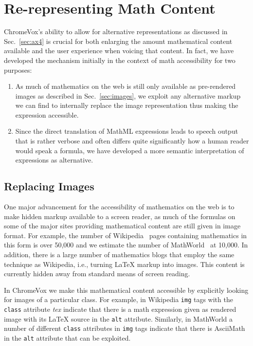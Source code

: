 \documentclass{sig-alternate}
\begin{document}
\section{Re-representing Math Content}
\label{sec:alternative}

ChromeVox's ability to allow for alternative representations as discussed in
Sec.~\ref{sec:ax4} is crucial for both enlarging the amount mathematical content
available and the user experience when voicing that content. In fact, we have
developed the mechanism initially in the context of math accessibility for two
purposes:
\begin{enumerate}
\item As much of mathematics on the web is still only available as
  pre-rendered images as described in Sec.~\ref{sec:images}, we exploit any
  alternative markup we can find to internally replace the image representation
  thus making the expression accessible. 
\item Since the direct translation of MathML expressions leads to speech output
  that is rather verbose and often differs quite significantly how a human
  reader would speak a formula, we have developed a more semantic interpretation
  of expressions as alternative.
\end{enumerate}

\subsection{Replacing Images}
\label{sec:rep-images}

One major advancement for the accessibility of mathematics on the web is to make
hidden markup available to a screen reader, as much of the formulas on some of
the major sites providing mathematical content are still given in image format.
For example, the number of Wikipedia~\cite{wikipedia} pages containing
mathematics in this form is over 50,000 and we estimate the number of
MathWorld~\cite{mathworld} at 10,000. In addition, there is a large number of
mathematics blogs that employ the same technique as Wikipedia, i.e., turning
{\LaTeX} markup into images. This content is currently hidden away from standard
means of screen reading.

In ChromeVox we make this mathematical content accessible by explicitly looking
for images of a particular class.  For example, in Wikipedia \texttt{img} tags
with the \texttt{class} attribute \emph{tex} indicate that there is a math
expression given as rendered image with its {\LaTeX} source in the \texttt{alt}
attribute.  Similarly, in MathWorld a number of different \texttt{class}
attributes in \texttt{img} tags indicate that there is AsciiMath in the
\texttt{alt} attribute that can be exploited.
\end{document}
